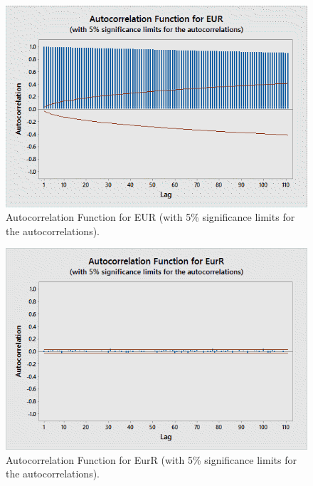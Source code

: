 	\begin{figure}[!ht]
	\centering
	\includegraphics[width=\textwidth]{chapters/chapter_mvts/figures/pautofun.png}
	\caption{Autocorrelation Function for EUR (with 5\% significance limits for the autocorrelations). \label{fig:pautofun}}
	\end{figure}

	\begin{figure}[!ht]
	\centering
	\includegraphics[width=\textwidth]{chapters/chapter_mvts/figures/pautofun2.png}
	\caption{Autocorrelation Function for EurR (with 5\% significance limits for the autocorrelations). \label{fig:pautofun2}}
	\end{figure}

